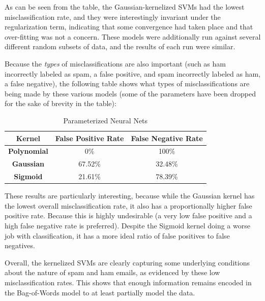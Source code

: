 \documentclass{article}
\begin{document}
As can be seen from the table, the Gaussian-kernelized SVMs had the lowest misclassification rate, and they were interestingly invariant under the regularization term, indicating that some convergence had taken place and that over-fitting was not a concern. These models were additionally run against several different random subsets of data, and the results of each run were similar. 

Because the \emph{types} of misclassifications are also important (such as ham incorrectly labeled as spam, a false positive, and spam incorrectly labeled as ham, a false negative), the following table shows what types of misclassifications are being made by these various models (some of the parameters have been dropped for the sake of brevity in the table):

\begin{table}[h!]
\begin{center}
\caption{Parameterized Neural Nets}
\hspace*{-1cm}\begin{tabular}{c|c|c}
\textbf{Kernel} & \textbf{False Positive Rate} & \textbf{False Negative Rate}\\
\hline
\textbf{Polynomial} &  0\% &  100\%  \\
\textbf{Gaussian} &  67.52\% &  32.48\%  \\
\textbf{Sigmoid} &  21.61\% &  78.39\%  \\
\end{tabular}
\end{center}
\end{table}
These results are particularly interesting, because while the Gaussian kernel has the lowest overall misclassification rate, it also has a proportionally higher false positive rate. Because this is highly undesirable (a very low false positive and a high false negative rate is preferred). Despite the Sigmoid kernel doing a worse job with classification, it has a more ideal ratio of false positives to false negatives.

Overall, the kernelized SVMs are clearly capturing some underlying conditions about the nature of spam and ham emails, as evidenced by these low misclassification rates. This shows that enough information remains encoded in the Bag-of-Words model to at least partially model the data.
\end{document}
